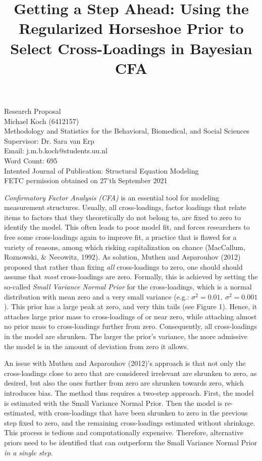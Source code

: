 \documentclass[
  man]{apa6}
\title{Getting a Step Ahead: Using the Regularized Horseshoe Prior to Select Cross-Loadings in Bayesian CFA}
\author{\phantom{0}}
\date{}
\affiliation{\phantom{0}}
\begin{document}
\maketitle

\vfill
Research Proposal \\
Michael Koch (6412157)\\
Methodology and Statistics for the Behavioral, Biomedical, and Social Sciences \\
Supervisor: Dr. Sara van Erp \\ 
Email: j.m.b.koch@students.uu.nl \\
Word Count: 695 \\
Intented Journal of Publication: Structural Equation Modeling \\
FETC permission obtained on 27'th September 2021

\setcounter{page}{0}
\thispagestyle{empty}
\pagestyle{plain}

\clearpage

\emph{Confirmatory Factor Analysis (CFA)} is an essential tool for modeling
measurement structures. Usually, all cross-loadings, factor
loadings that relate items to factors that they theoretically do not belong to, are fixed to zero to identify the model. This often leads to poor model fit,
and forces researchers to free some cross-loadings again
to improve fit, a practice that is flawed for a variety of reasons,
among which risking capitalization on chance
(MacCallum, Roznowski, \& Necowitz, 1992). As solution,
Muthen and Asparouhov (2012) proposed that rather than fixing \emph{all}
cross-loadings to zero, one should should assume that \emph{most}
cross-loadings are zero. Formally, this is achieved by setting the
so-called \emph{Small Variance Normal Prior} for the cross-loadings, which is a
normal distribution with mean zero and a very small variance (e.g.:
\(\sigma^2 = 0.01, \  \sigma^2 = 0.001\)). This prior has a large peak at zero, and very thin tails (see Figure 1). Hence, it attaches large prior mass to cross-loadings of or near zero, while attaching almost no prior mass to cross-loadings further from zero. Consequently, all cross-loadings in the model are
shrunken. The larger the prior's variance, the more
admissive the model is in the amount of deviation from zero it allows.

An issue with Muthen and Asparouhov (2012)'s approach is that not only the cross-loadings
close to zero that are considered irrelevant are shrunken to zero, as
desired, but also the ones further from zero are shrunken
towards zero, which introduces bias. The method thus requires a two-step
approach. First, the model is estimated with the Small Variance Normal Prior. Then the model
is re-estimated, with cross-loadings that have been shrunken to zero in
the previous step fixed to zero, and the remaining cross-loadings
estimated without shrinkage. This process is tedious and computationally expensive. Therefore, alternative priors need
to be identified that can outperform the Small Variance Normal Prior \emph{in a single step}.
\end{document}
